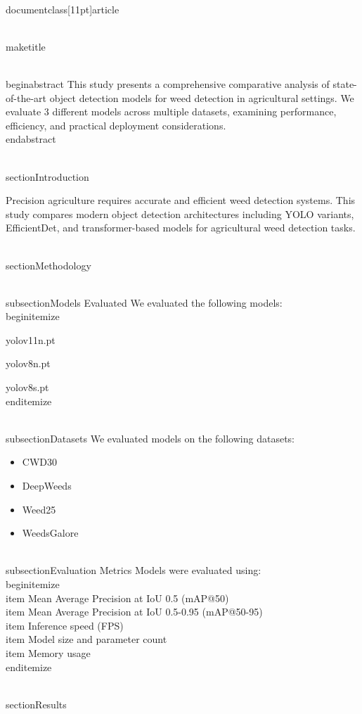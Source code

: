 \\documentclass[11pt]{article}
\begin{document}
\\maketitle

\\begin{abstract}
This study presents a comprehensive comparative analysis of state-of-the-art object detection models for weed detection in agricultural settings. We evaluate 3 different models across multiple datasets, examining performance, efficiency, and practical deployment considerations.
\\end{abstract}

\\section{Introduction}

Precision agriculture requires accurate and efficient weed detection systems. This study compares modern object detection architectures including YOLO variants, EfficientDet, and transformer-based models for agricultural weed detection tasks.

\\section{Methodology}

\\subsection{Models Evaluated}
We evaluated the following models:
\\begin{itemize}
\item yolov11n.pt
\item yolov8n.pt
\item yolov8s.pt
\\end{itemize}

\\subsection{Datasets}
We evaluated models on the following datasets:
\begin{itemize}
\item CWD30
\item DeepWeeds
\item Weed25
\item WeedsGalore
\end{itemize}

\\subsection{Evaluation Metrics}
Models were evaluated using:
\\begin{itemize}
\\item Mean Average Precision at IoU 0.5 (mAP@50)
\\item Mean Average Precision at IoU 0.5-0.95 (mAP@50-95)
\\item Inference speed (FPS)
\\item Model size and parameter count
\\item Memory usage
\\end{itemize}

\\section{Results}
\end{document}
